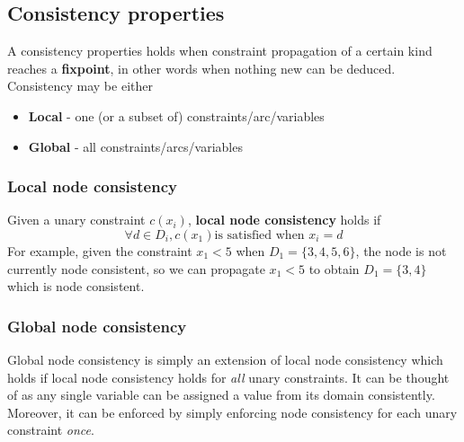 \documentclass[CS4402-Notes.tex]{subfiles}
\begin{document}
\subsection{Consistency properties}
A consistency properties holds when constraint propagation of a certain kind reaches a \textbf{fixpoint}, in other words when nothing new can be deduced. Consistency may be either
\begin{itemize}
\item \textbf{Local} - one (or a subset of) constraints/arc/variables
\item \textbf{Global} - all constraints/arcs/variables
\end{itemize}

\subsubsection{Local node consistency}
Given a unary constraint $c(x_i)$, \textbf{local node consistency} holds if
\begin{equation}
\forall d \in D_i, c(x_1) \text{is satisfied when } x_i = d
\end{equation}
For example, given the constraint $x_1 < 5$ when $D_1 = \{3,4,5,6\}$, the node is not currently node consistent, so we can propagate $x_1 < 5$ to obtain $D_1 = \{3,4\}$ which is node consistent.

\subsubsection{Global node consistency}
Global node consistency is simply an extension of local node consistency which holds if local node consistency holds for \textit{all} unary constraints. It can be thought of as any single variable can be assigned a value from its domain consistently. Moreover, it can be enforced by simply enforcing node consistency for each unary constraint \textit{once}. 
\end{document}
